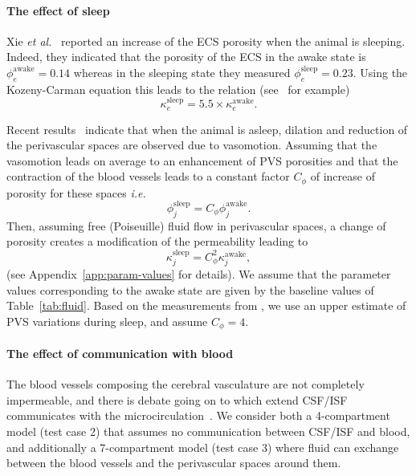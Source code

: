 \documentclass[10pt]{article}
\newcommand{\ie}{\emph{i.e.}\;}
\newcommand{\etal}{\emph{et al.}\;}
\newcommand{\1}{^{(1)}}
\newcommand{\2}{^{(2)}}
\begin{document}
\paragraph{The effect of sleep}
Xie \etal~\cite{Xie_2013_sleep} reported an increase of the ECS porosity when the animal is sleeping. Indeed, they indicated that the porosity of the ECS in the awake state is $\phi_e^\text{awake} = 0.14$ whereas in the sleeping state they measured $\phi_e^\text{sleep}=0.23$. Using the Kozeny-Carman equation this leads to the relation (see~\cite{tithof-2022-glymphatic} for example)
\[
    \kappa_e^{\text{sleep}}= 5.5\times \kappa_e^\text{awake}.
\]

Recent results~\cite{Bojarskaite2022} indicate that when the animal is asleep, dilation and reduction  of the perivascular spaces are observed due to vasomotion. Assuming that the vasomotion leads on average to an enhancement of PVS porosities and that the contraction of the blood vessels leads to a constant factor $C_\phi$ of increase of porosity for these spaces \ie 
\[
    \phi^\text{sleep}_j = C_\phi \phi_j^\text{awake}.
\]
Then, assuming free (Poiseuille) fluid flow in perivascular spaces, a change of porosity creates a modification of the permeability leading to 
\[
    \kappa_j^\text{sleep} = C_\phi^2 \kappa_j^\text{awake},
\]
(see Appendix~\ref{app:param-values} for details).
We assume that the parameter values corresponding to the awake state are given by the baseline values of Table~\ref{tab:fluid}. Based on the measurements from \cite{Bojarskaite2022}, we use an upper estimate of PVS variations during sleep, and assume $C_\phi=4$.


\paragraph{The effect of communication with blood}
The blood vessels composing the cerebral vasculature are not completely impermeable, and there is debate going on to which extend CSF/ISF communicates with the microcirculation~\cite{Oreskovic-2010-formation}. We consider both a 4-compartment model (test case 2) that assumes no communication between CSF/ISF and blood, and additionally a 7-compartment model (test case 3) where fluid can exchange between the blood vessels and the perivascular spaces around them. 
\end{document}
